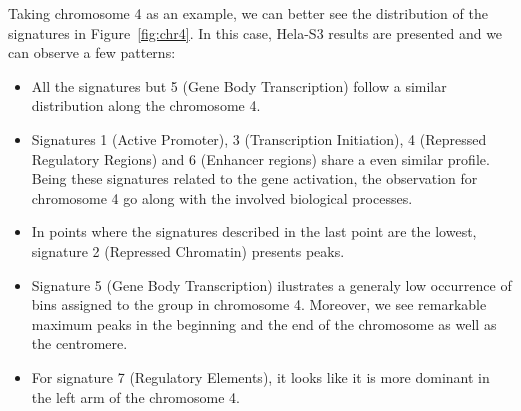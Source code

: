 \medskip

Taking chromosome 4 as an example, we can better see the distribution of the signatures in Figure~\ref{fig:chr4}. In this case, Hela-S3 results are presented and we can observe a few patterns:

\begin{itemize}
    \item All the signatures but 5 (Gene Body Transcription) follow a similar distribution along the chromosome 4.
    \item Signatures 1 (Active Promoter), 3 (Transcription Initiation), 4 (Repressed Regulatory Regions) and 6 (Enhancer regions) share a even similar profile. Being these signatures related to the gene activation, the observation for chromosome 4 go along with the involved biological processes.
    \item In points where the signatures described in the last point are the lowest, signature 2 (Repressed Chromatin) presents peaks.
    \item Signature 5 (Gene Body Transcription) ilustrates a generaly low occurrence of bins assigned to the group in chromosome 4. Moreover, we see remarkable maximum peaks in the beginning and the end of the chromosome as well as the centromere.
    \item For signature 7 (Regulatory Elements), it looks like it is more dominant in the left arm of the chromosome 4.
\end{itemize}
